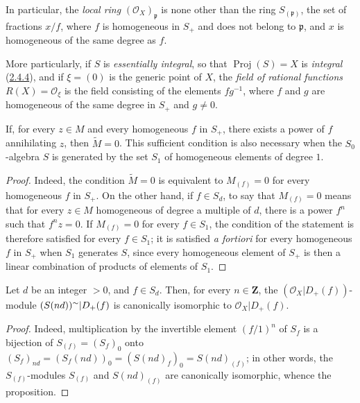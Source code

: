 In particular, the \emph{local ring} $(\mathcal{O}_X)_\mathfrak{p}$ is none
other than the ring $S_{(\mathfrak{p})}$, the set of fractions $x/f$, where
$f$ is homogeneous in $S_+$ and does not belong to $\mathfrak{p}$, and $x$
is homogeneous of the same degree as $f$.

More particularly, if $S$ is \emph{essentially integral}, so
that $\operatorname{Proj}(S)=X$ is \emph{integral}
(\hyperref[II.2.4.4]{2.4.4}), and if $\xi=(0)$ is the generic point of
$X$, the \emph{field of rational functions}
$R(X)=\mathcal{O}_\xi$ is the field consisting of the elements $fg^{-1}$,
where $f$ and $g$ are homogeneous of the same degree in $S_+$ and $g\neq0$.

\begin{proposition}[2.5.6]
\label{II.2.5.6}
If, for every $z\in M$ and every homogeneous $f$ in $S_+$, there exists a
power of $f$ annihilating $z$, then $\widetilde{M}=0$. This sufficient
condition is also necessary when the $S_0$-algebra $S$ is generated
by the set $S_1$ of homogeneous elements of degree $1$.
\end{proposition}

\begin{proof}
Indeed, the condition $\widetilde{M}=0$ is equivalent to $M_{(f)}=0$ for
every homogeneous $f$ in $S_+$. On the other hand, if $f\in S_d$, to say that
$M_{(f)}=0$ means that for every $z\in M$ homogeneous of degree a multiple
of $d$, there is a power $f^n$ such that $f^nz=0$. If $M_{(f)}=0$ for every
$f\in S_1$, the condition of the statement is therefore satisfied for every
$f\in S_1$; it is satisfied \emph{a fortiori} for every homogeneous $f$ in
$S_+$ when $S_1$ generates $S$, since every homogeneous element of $S_+$
is then a linear combination of products of elements of $S_1$.
\end{proof}

\begin{proposition}[2.5.7]
\label{II.2.5.7}
Let $d$ be an integer $>0$, and $f\in S_d$. Then, for every
$n\in\mathbf{Z}$, the $(\mathcal{O}_X|D_+(f))$-module
$(S(nd))^{\sim}|D_+(f)$ is canonically isomorphic to
$\mathcal{O}_X|D_+(f)$.
\end{proposition}

\begin{proof}
Indeed, multiplication by the invertible element $(f/1)^n$ of $S_f$
is a bijection of $S_{(f)}=(S_f)_0$ onto
$(S_f)_{nd}=(S_f(nd))_0=(S(nd)_f)_0=S(nd)_{(f)}$; in other words, the
$S_{(f)}$-modules $S_{(f)}$ and $S(nd)_{(f)}$ are canonically
isomorphic, whence the proposition.
\end{proof}

